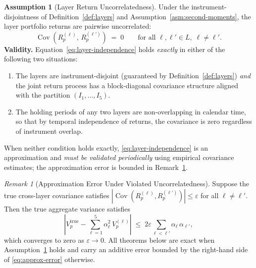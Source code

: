 \documentclass[12pt,openany]{book}
\DeclareMathOperator{\Cov}{Cov}
\numberwithin{equation}{chapter}
\theoremstyle{plain}
\theoremstyle{definition}
\newtheorem{assumption}[theorem]{Assumption}
\theoremstyle{remark}
\newtheorem{remark}[theorem]{Remark}
\def\mathcal#1{#1}%
\begin{document}
\begin{assumption}[Layer Return Uncorrelatedness]
\label{asm:layer-independence}
Under the instrument-disjointness of Definition~\ref{def:layers}
and Assumption~\ref{asm:second-moments}, the layer portfolio
returns are pairwise uncorrelated:
\begin{equation}
  \Cov\!\left(R_p^{(\ell)},\, R_p^{(\ell')}\right)
  \;=\; 0
  \qquad \text{for all } \ell,\ell' \in \mathcal{L},\;
  \ell \neq \ell'.
  \label{eq:layer-independence}
\end{equation}
\noindent\textbf{Validity.}
Equation~\eqref{eq:layer-independence} holds \emph{exactly} in
either of the following two situations:
\begin{enumerate}
  \item The layers are instrument-disjoint (guaranteed by
        Definition~\ref{def:layers}) \emph{and} the joint return
        process has a block-diagonal covariance structure aligned
        with the partition $(\mathcal{I}_1,\ldots,\mathcal{I}_5)$.
  \item The holding periods of any two layers are non-overlapping
        in calendar time, so that by temporal independence of
        returns, the covariance is zero regardless of instrument
        overlap.
\end{enumerate}
When neither condition holds exactly,
\eqref{eq:layer-independence} is an approximation and
\emph{must be validated periodically} using empirical covariance
estimates; the approximation error is bounded in
Remark~\ref{rem:approx-error}.
\end{assumption}

\begin{remark}[Approximation Error Under Violated Uncorrelatedness]
\label{rem:approx-error}
Suppose the true cross-layer covariance satisfies
$|\Cov(R_p^{(\ell)}, R_p^{(\ell')})| \leq \varepsilon$ for all
$\ell \neq \ell'$.  Then the true aggregate variance satisfies
\begin{equation}
  \left|V_p^{\mathrm{true}}
  - \sum_{\ell=1}^{5} \alpha_\ell^2\, V_p^{(\ell)}\right|
  \;\leq\;
  2\varepsilon \sum_{\ell < \ell'} \alpha_\ell\, \alpha_{\ell'},
  \label{eq:approx-error}
\end{equation}
which converges to zero as $\varepsilon \to 0$.  All theorems
below are exact when Assumption~\ref{asm:layer-independence} holds
and carry an additive error bounded by the right-hand side of
\eqref{eq:approx-error} otherwise.
\end{remark}
\end{document}
